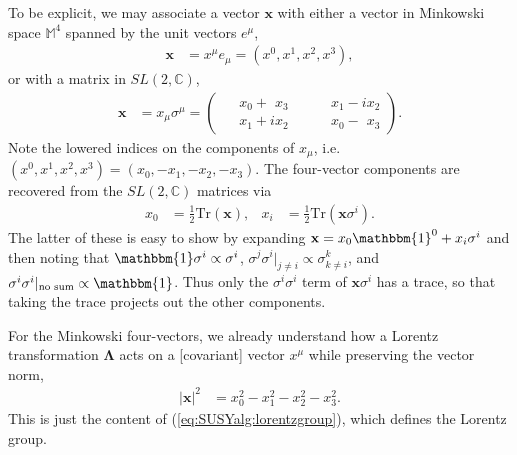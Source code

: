 To be explicit, we may associate a vector $\mathbf x$ with either a vector in Minkowski space $\mathbb M^4$ spanned by the unit vectors $e^\mu$,
\begin{align}
    \mathbf x &= x^\mu e_\mu = \left(x^0,x^1,x^2,x^3\right),\label{eq:susyalg:vectorrep}
\end{align}
    or with a matrix in $SL(2,\mathbb C)$,
\begin{align}
    \mathbf x &= x_\mu \sigma^\mu
              = \begin{pmatrix}
                \phantom+x_0 + \phantom{i} x_3 &\quad \phantom+ x_1-ix_2\\
                \phantom+x_1+ix_2 &\quad \phantom+ x_0-\phantom{i} x_3
              \end{pmatrix}.\label{eq:susyalg:sl2crep}
\end{align}
Note the lowered indices on the components of $x_\mu$, i.e. $(x^0,x^1,x^2,x^3) = (x_0,-x_1,-x_2,-x_3)$. The four-vector components are recovered from the $SL(2,\mathbb C)$ matrices via
\begin{align}
    x_0 &= \frac 12\text{Tr}(\mathbf{x}), & x_i &= \frac 12\text{Tr}(\mathbf{x}\sigma^i).\label{eq:SUSYalg:sl2ctom4}
\end{align}
The latter of these is easy to show by expanding $\mathbf{x} = x_0\mathbbm{1}^0 + x_i\sigma^i$ and then noting that $\mathbbm{1}\sigma^i \propto \sigma^i$, $\sigma^j\sigma^i|_{j\neq i}\propto \sigma^k_{k\neq i}$, and $\sigma^i\sigma^i|_{\text{no sum}}\propto \mathbbm{1}$. Thus only the $\sigma^i\sigma^i$ term of $\mathbf{x}\sigma^i$ has a trace, so that taking the trace projects out the other components.

For the Minkowski four-vectors, we already understand how a Lorentz transformation $\mathbf \Lambda$ acts on a [covariant] vector $x^\mu$ while preserving the vector norm,   
\begin{align}
    |\mathbf x |^2 &= x_0^2 - x_1^2 - x_2^2 - x_3^2.\label{eq:SUSYalg:mink:invt}
\end{align}
This is just the content of  (\ref{eq:SUSYalg:lorentzgroup}), which defines the Lorentz group.

